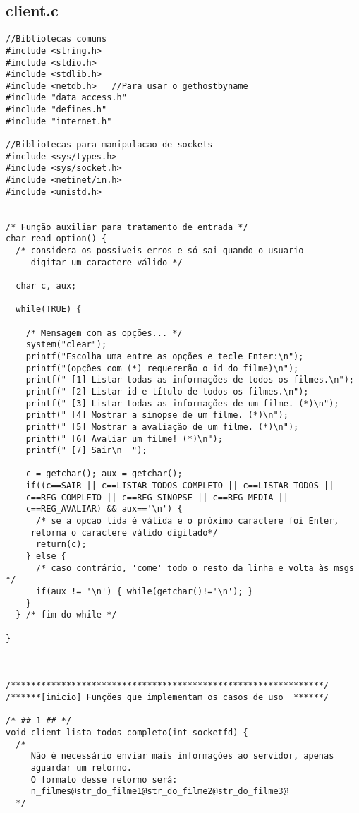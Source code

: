 \documentclass[11pt,twoside]{article}
\begin{document}
\subsection{client.c}       %
\begin{verbatim}
//Bibliotecas comuns
#include <string.h>
#include <stdio.h>
#include <stdlib.h>
#include <netdb.h>   //Para usar o gethostbyname
#include "data_access.h"
#include "defines.h"
#include "internet.h"

//Bibliotecas para manipulacao de sockets
#include <sys/types.h>
#include <sys/socket.h>
#include <netinet/in.h>
#include <unistd.h>


/* Função auxiliar para tratamento de entrada */
char read_option() {
  /* considera os possiveis erros e só sai quando o usuario
     digitar um caractere válido */

  char c, aux;

  while(TRUE) {

    /* Mensagem com as opções... */
    system("clear");
    printf("Escolha uma entre as opções e tecle Enter:\n");
    printf("(opções com (*) requererão o id do filme)\n");
    printf(" [1] Listar todas as informações de todos os filmes.\n");
    printf(" [2] Listar id e título de todos os filmes.\n");
    printf(" [3] Listar todas as informações de um filme. (*)\n");
    printf(" [4] Mostrar a sinopse de um filme. (*)\n");
    printf(" [5] Mostrar a avaliação de um filme. (*)\n");
    printf(" [6] Avaliar um filme! (*)\n");
    printf(" [7] Sair\n  ");

    c = getchar(); aux = getchar();
    if((c==SAIR || c==LISTAR_TODOS_COMPLETO || c==LISTAR_TODOS ||
	c==REG_COMPLETO || c==REG_SINOPSE || c==REG_MEDIA ||
	c==REG_AVALIAR) && aux=='\n') {
      /* se a opcao lida é válida e o próximo caractere foi Enter, 
	 retorna o caractere válido digitado*/
      return(c);
    } else {
      /* caso contrário, 'come' todo o resto da linha e volta às msgs */
      if(aux != '\n') { while(getchar()!='\n'); }
    }
  } /* fim do while */

}



/**************************************************************/
/******[inicio] Funções que implementam os casos de uso  ******/

/* ## 1 ## */
void client_lista_todos_completo(int socketfd) {
  /* 
     Não é necessário enviar mais informações ao servidor, apenas
     aguardar um retorno.
     O formato desse retorno será:
     n_filmes@str_do_filme1@str_do_filme2@str_do_filme3@
  */


\end{verbatim}
\end{document}
